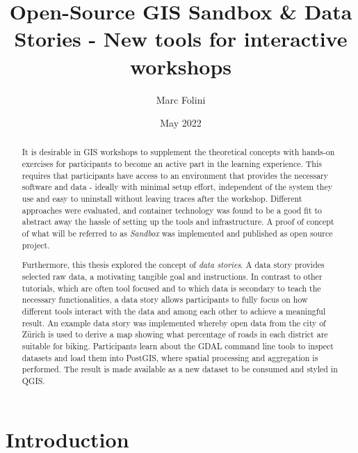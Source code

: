 \documentclass[11pt, a4paper, oneside, parskip=full-]{scrartcl}
\title{Open-Source GIS Sandbox \& Data Stories - New tools for interactive workshops}
\author{Marc Folini}
\date{May 2022}
\begin{document}
\begin{titlepage}
  \setcounter{page}{1}
  \clearpage\maketitle
  \thispagestyle{empty}
  \begin{abstract}
    It is desirable in GIS workshops to supplement the theoretical concepts with
    hands-on exercises for participants to become an active part in the learning
    experience. This requires that participants have access to an environment
    that provides the necessary software and data - ideally with minimal setup
    effort, independent of the system they use and easy to uninstall without
    leaving traces after the workshop. Different approaches were evaluated, and
    container technology was found to be a good fit to abstract away the hassle
    of setting up the tools and infrastructure. A proof of concept of what will
    be referred to as \emph{Sandbox} was implemented and published as open
    source project.

    Furthermore, this thesis explored the concept of \emph{data stories}. A data
    story provides selected raw data, a motivating tangible goal and
    instructions. In contrast to other tutorials, which are often tool focused
    and to which data is secondary to teach the necessary functionalities, a
    data story allows participants to fully focus on how different tools
    interact with the data and among each other to achieve a meaningful result.
    An example data story was implemented whereby open data from the city of
    Zürich is used to derive a map showing what percentage of roads in each
    district are suitable for biking. Participants learn about the GDAL command
    line tools to inspect datasets and load them into PostGIS, where spatial
    processing and aggregation is performed. The result is made available as a
    new dataset to be consumed and styled in QGIS.
  \end{abstract}
\end{titlepage}

\newpage
\tableofcontents

\newpage
{}
\setcounter{page}{1}
\section{Introduction}
\end{document}
